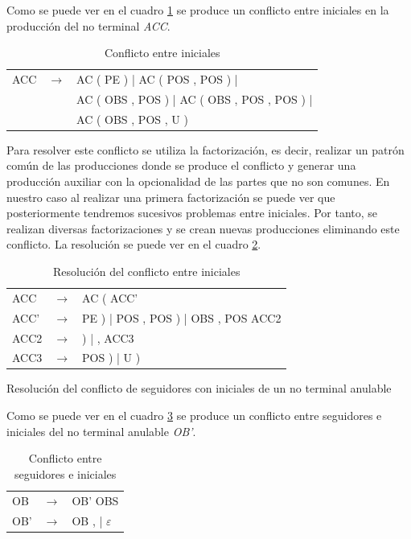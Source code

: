 \documentclass[11pt,a4paper,spanish,twoside]{book}
\makeatletter
\renewcommand{\section}{
  \@startsection{section}{1}{0mm}{\baselineskip}
  {2.5mm}{\Large\bf}
}
\theoremstyle{plain} \newtheorem{nota}{Nota}
\makeatother
\begin{document}
Como se puede ver en el cuadro \ref{ini} se produce un conflicto entre iniciales
en la producción del no terminal \emph{ACC}.
\begin{table}[!ht]
  \centering
  \begin{tabular}{lll}
    \hline
    ACC & $\to$ & AC ( PE ) | AC ( POS , POS ) |\\
        &       & AC ( OBS , POS ) | AC ( OBS , POS , POS ) |\\
        &       & AC ( OBS , POS , U )\\
    \hline
  \end{tabular}
  \caption{Conflicto entre iniciales}\label{ini}
\end{table}

Para resolver este conflicto se utiliza la factorización, es decir, realizar un
patrón común de las producciones donde se produce el conflicto y generar una 
producción auxiliar con la opcionalidad de las partes que no son comunes. En 
nuestro caso al realizar una primera factorización se puede ver que 
posteriormente tendremos sucesivos problemas entre iniciales. Por tanto, se 
realizan diversas factorizaciones y se crean nuevas producciones eliminando este
conflicto. La resolución se puede ver en el cuadro \ref{ini1}.

\begin{table}[!ht]
  \centering
  \begin{tabular}{lll}
    \hline
    ACC  & $\to$ & AC ( ACC'\\
    ACC' & $\to$ & PE ) | POS , POS ) | OBS , POS ACC2\\
    ACC2 & $\to$ & ) | , ACC3\\
    ACC3 & $\to$ & POS ) | U )\\
    \hline
  \end{tabular}
  \caption{Resolución del conflicto entre iniciales}\label{ini1}
\end{table}

\section{Resolución del conflicto de seguidores con iniciales de un no terminal
 anulable}

Como se puede ver en el cuadro \ref{seg} se produce un conflicto entre 
seguidores e iniciales del no terminal anulable \emph{OB'}.
\begin{table}[!ht]
  \centering
  \begin{tabular}{lll}
    \hline
    OB  & $\to$ & OB' OBS\\
    OB' & $\to$ & OB , | $\varepsilon$\\
    \hline
  \end{tabular}
  \caption{Conflicto entre seguidores e iniciales}\label{seg}
\end{table}
\end{document}
